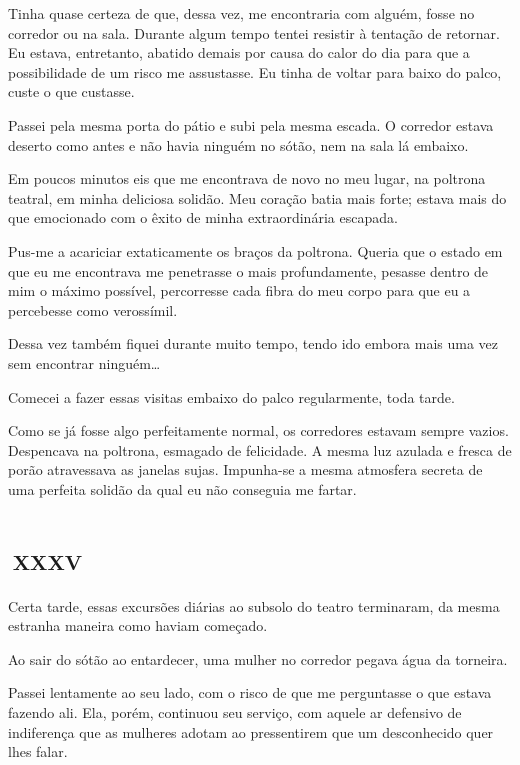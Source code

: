 Tinha quase certeza de que, dessa vez, me encontraria com alguém, fosse no corredor ou na sala. Durante algum tempo tentei resistir à tentação de retornar. Eu estava, entretanto, abatido demais por causa do calor do dia para que a possibilidade de um risco me assustasse. Eu tinha de voltar para baixo do palco, custe o que custasse.

Passei pela mesma porta do pátio e subi pela mesma escada. O corredor estava deserto como antes e não havia ninguém no sótão, nem na sala lá embaixo.

Em poucos minutos eis que me encontrava de novo no meu lugar, na poltrona teatral, em minha deliciosa solidão. Meu coração batia mais forte; estava mais do que emocionado com o êxito de minha extraordinária escapada.

Pus-me a acariciar extaticamente os braços da poltrona. Queria que o estado em que eu me encontrava me penetrasse o mais profundamente, pesasse dentro de mim o máximo possível, percorresse cada fibra do meu corpo para que eu a percebesse como verossímil.

Dessa vez também fiquei durante muito tempo, tendo ido embora mais uma vez sem encontrar ninguém\ldots{}

Comecei a fazer essas visitas embaixo do palco regularmente, toda tarde.

Como se já fosse algo perfeitamente normal, os corredores estavam sempre vazios. Despencava na poltrona, esmagado de felicidade. A mesma luz azulada e fresca de porão atravessava as janelas sujas. Impunha-se a mesma atmosfera secreta de uma perfeita solidão da qual eu não conseguia me fartar.


\chapter*{\small{}\,\Large\centering\textsc{xxxv}\,\small{}}

Certa tarde, essas excursões diárias ao subsolo do teatro terminaram, da mesma estranha maneira como haviam começado.

Ao sair do sótão ao entardecer, uma mulher no corredor pegava água da torneira.

Passei lentamente ao seu lado, com o risco de que me perguntasse o que estava fazendo ali. Ela, porém, continuou seu serviço, com aquele ar defensivo de indiferença que as mulheres adotam ao pressentirem que um desconhecido quer lhes falar.

